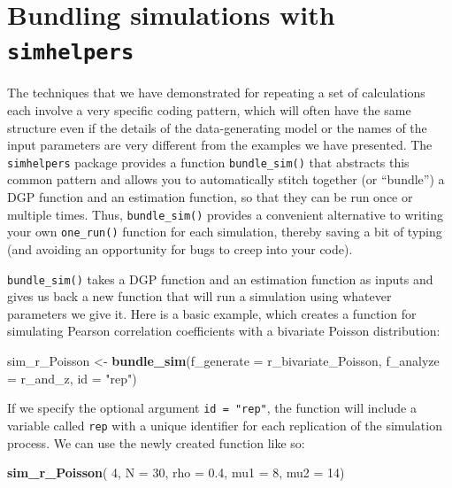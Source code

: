 \documentclass[
]{book}
\newenvironment{Shaded}{\begin{snugshade}}{\end{snugshade}}
\newcommand{\AttributeTok}[1]{\textcolor[rgb]{0.13,0.29,0.53}{#1}}
\newcommand{\DecValTok}[1]{\textcolor[rgb]{0.00,0.00,0.81}{#1}}
\newcommand{\FloatTok}[1]{\textcolor[rgb]{0.00,0.00,0.81}{#1}}
\newcommand{\FunctionTok}[1]{\textcolor[rgb]{0.13,0.29,0.53}{\textbf{#1}}}
\newcommand{\NormalTok}[1]{#1}
\newcommand{\OtherTok}[1]{\textcolor[rgb]{0.56,0.35,0.01}{#1}}
\newcommand{\StringTok}[1]{\textcolor[rgb]{0.31,0.60,0.02}{#1}}
\begin{document}
\section{\texorpdfstring{Bundling simulations with \texttt{simhelpers}}{Bundling simulations with simhelpers}}\label{bundle-sim-demo}

The techniques that we have demonstrated for repeating a set of calculations each involve a very specific coding pattern, which will often have the same structure even if the details of the data-generating model or the names of the input parameters are very different from the examples we have presented.
The \texttt{simhelpers} package provides a function \texttt{bundle\_sim()} that abstracts this common pattern and allows you to automatically stitch together (or ``bundle'') a DGP function and an estimation function, so that they can be run once or multiple times.
Thus, \texttt{bundle\_sim()} provides a convenient alternative to writing your own \texttt{one\_run()} function for each simulation, thereby saving a bit of typing (and avoiding an opportunity for bugs to creep into your code).

\texttt{bundle\_sim()} takes a DGP function and an estimation function as inputs and gives us back a new function that will run a simulation using whatever parameters we give it.
Here is a basic example, which creates a function for simulating Pearson correlation coefficients with a bivariate Poisson distribution:

\begin{Shaded}
\begin{Highlighting}[]
\NormalTok{sim\_r\_Poisson }\OtherTok{\textless{}{-}} \FunctionTok{bundle\_sim}\NormalTok{(}\AttributeTok{f\_generate =}\NormalTok{ r\_bivariate\_Poisson, }
                            \AttributeTok{f\_analyze =}\NormalTok{ r\_and\_z, }
                            \AttributeTok{id =} \StringTok{"rep"}\NormalTok{)}
\end{Highlighting}
\end{Shaded}

If we specify the optional argument \texttt{id\ =\ "rep"}, the function will include a variable called \texttt{rep} with a unique identifier for each replication of the simulation process.
We can use the newly created function like so:

\begin{Shaded}
\begin{Highlighting}[]
\FunctionTok{sim\_r\_Poisson}\NormalTok{( }\DecValTok{4}\NormalTok{, }\AttributeTok{N =} \DecValTok{30}\NormalTok{, }\AttributeTok{rho =} \FloatTok{0.4}\NormalTok{, }\AttributeTok{mu1 =} \DecValTok{8}\NormalTok{, }\AttributeTok{mu2 =} \DecValTok{14}\NormalTok{)}
\end{Highlighting}
\end{Shaded}
\end{document}
